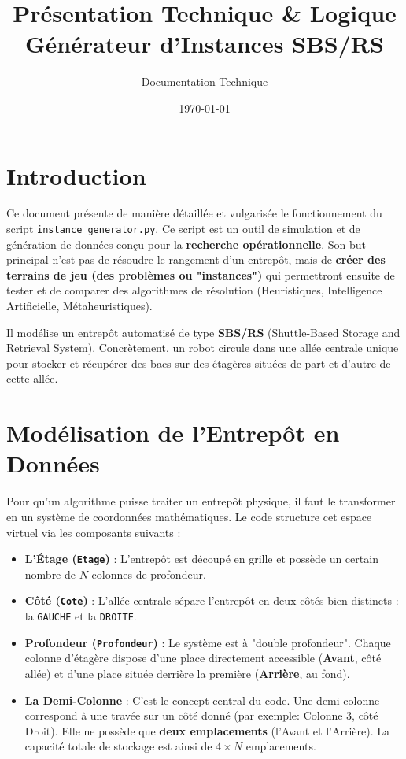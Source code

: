\documentclass[12pt,a4paper]{article}
\title{\textbf{Présentation Technique \& Logique}\\ Générateur d'Instances SBS/RS}
\author{Documentation Technique}
\date{\today}
\begin{document}
\maketitle
\tableofcontents
\newpage

\section{Introduction}
Ce document présente de manière détaillée et vulgarisée le fonctionnement du script \texttt{instance\_generator.py}. Ce script est un outil de simulation et de génération de données conçu pour la \textbf{recherche opérationnelle}. Son but principal n'est pas de résoudre le rangement d'un entrepôt, mais de \textbf{créer des terrains de jeu (des problèmes ou "instances")} qui permettront ensuite de tester et de comparer des algorithmes de résolution (Heuristiques, Intelligence Artificielle, Métaheuristiques).

Il modélise un entrepôt automatisé de type \textbf{SBS/RS} (Shuttle-Based Storage and Retrieval System). Concrètement, un robot circule dans une allée centrale unique pour stocker et récupérer des bacs sur des étagères situées de part et d'autre de cette allée.

\section{Modélisation de l'Entrepôt en Données}
Pour qu'un algorithme puisse traiter un entrepôt physique, il faut le transformer en un système de coordonnées mathématiques. Le code structure cet espace virtuel via les composants suivants :

\begin{itemize}
    \item \textbf{L'Étage (\texttt{Etage})} : L'entrepôt est découpé en grille et possède un certain nombre de $N$ colonnes de profondeur.
    \item \textbf{Côté (\texttt{Cote})} : L'allée centrale sépare l'entrepôt en deux côtés bien distincts : la \texttt{GAUCHE} et la \texttt{DROITE}.
    \item \textbf{Profondeur (\texttt{Profondeur})} : Le système est à "double profondeur". Chaque colonne d'étagère dispose d'une place directement accessible (\textbf{Avant}, côté allée) et d'une place située derrière la première (\textbf{Arrière}, au fond).
    \item \textbf{La Demi-Colonne} : C'est le concept central du code. Une demi-colonne correspond à une travée sur un côté donné (par exemple: Colonne 3, côté Droit). Elle ne possède que \textbf{deux emplacements} (l'Avant et l'Arrière). La capacité totale de stockage est ainsi de $4 \times N$ emplacements.
\end{itemize}
\end{document}
